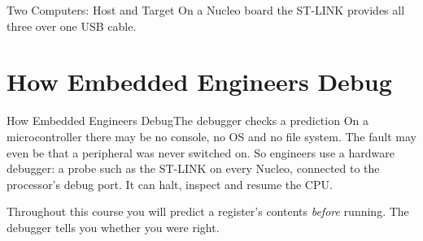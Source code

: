 \documentclass[9pt,aspectratio=169,xcolor=table]{beamer}
\begin{document}
\begin{frame}{Two Computers: Host and Target}
    \vspace{2mm}
    {\small On a Nucleo board the \alert{ST-LINK} provides all three over one USB cable.}
\end{frame}


\section{How Embedded Engineers Debug}

\begin{frame}{How Embedded Engineers Debug}{The debugger checks a prediction}
    \leavevmode
    {\small On a microcontroller there may be no console, no OS and no file system. The fault may even be that a peripheral was never switched on. So engineers use a \alert{hardware debugger}: a probe such as the ST-LINK on every Nucleo, connected to the processor's debug port. It can halt, inspect and resume the CPU.}

    \vspace{2mm}
    \begin{center}
    \end{center}

    \vspace{1mm}
    {\small Throughout this course you will predict a register's contents \emph{before} running. The debugger tells you whether you were right.}
\end{frame}
\end{document}
